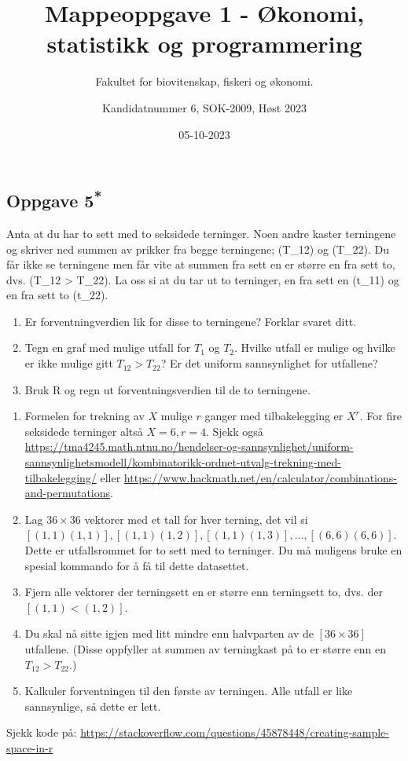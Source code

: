 \documentclass[
  letterpaper,
  DIV=11,
  numbers=noendperiod]{scrartcl}
\title{Mappeoppgave 1 - Økonomi, statistikk og programmering}
\subtitle{Fakultet for biovitenskap, fiskeri og økonomi.}
\author{Kandidatnummer 6, SOK-2009, Høst 2023}
\date{05-10-2023}
\renewcommand*\contentsname{Table of contents}
\newcommand\contentsname{Table of contents}
\begin{document}
\maketitle
\ifdefined\Shaded\renewenvironment{Shaded}{\begin{tcolorbox}[boxrule=0pt, frame hidden, sharp corners, borderline west={3pt}{0pt}{shadecolor}, interior hidden, breakable, enhanced]}{\end{tcolorbox}}\fi

\renewcommand*\contentsname{Innholdsliste}
{
\hypersetup{linkcolor=}
\setcounter{tocdepth}{3}
\tableofcontents
}
\hypertarget{oppgave-5}{%
\subsection{\texorpdfstring{Oppgave
5\textsuperscript{*}}{Oppgave 5*}}\label{oppgave-5}}

Anta at du har to sett med to seksidede terninger. Noen andre kaster terningene og skriver ned summen av prikker fra begge terningene; (T_{12}) og (T_{22}). Du får ikke se terningene men får vite at summen fra sett en er større en fra sett to, dvs. (T_{12} > T_{22}). La oss si at du tar ut to terninger, en fra sett en (t_{11}) og en fra sett to (t_{22}).

\begin{enumerate}
    \item Er forventningverdien lik for disse to terningene? Forklar svaret ditt.
    \item Tegn en graf med mulige utfall for \(T_1\) og \(T_2\). Hvilke utfall er mulige og hvilke er ikke mulige gitt \(T_{12} > T_{22}\)? Er det uniform sannsynlighet for utfallene?
    \item Bruk R og regn ut forventningsverdien til de to terningene.
\end{enumerate}

\begin{enumerate}
    \item Formelen for trekning av \(X\) mulige \(r\) ganger med tilbakelegging er \(X^r\). For fire seksidede terninger altså \(X = 6, r = 4\). Sjekk også \url{https://tma4245.math.ntnu.no/hendelser-og-sannsynlighet/uniform-sannsynlighetsmodell/kombinatorikk-ordnet-utvalg-trekning-med-tilbakelegging/} eller \url{https://www.hackmath.net/en/calculator/combinations-and-permutations}.
    \item Lag \(36 \times 36\) vektorer med et tall for hver terning, det vil si \([(1,1)(1,1)], [(1,1)(1,2)],[(1,1)(1,3)],\ldots, [(6,6)(6,6)]\). Dette er utfallsrommet for to sett med to terninger. Du må muligens bruke en spesial kommando for å få til dette datasettet.
    \item Fjern alle vektorer der terningsett en er større enn terningsett to, dvs. der \([(1, 1) < (1, 2)]\).
    \item Du skal nå sitte igjen med litt mindre enn halvparten av de \([36 \times 36 ]\) utfallene. (Disse oppfyller at summen av terningkast på to er større enn en \(T_{12} > T_{22}\).)
    \item Kalkuler forventningen til den første av terningen. Alle utfall er like sannsynlige, så dette er lett.
\end{enumerate}

Sjekk kode på:
\url{https://stackoverflow.com/questions/45878448/creating-sample-space-in-r}
\end{document}
